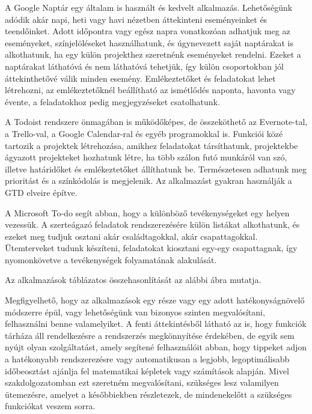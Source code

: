 


A Google Naptár egy általam is használt és kedvelt alkalmazás. Lehetőségünk adódik akár napi, heti vagy havi nézetben áttekinteni eseményeinket és teendőinket. Adott időpontra vagy egész napra vonatkozóan adhatjuk meg az eseményeket, színjelöléseket használhatunk, és úgynevezett saját naptárakat is alkothatunk, ha egy külön projekthez szeretnénk eseményeket rendelni. Ezeket a naptárakat láthatóvá és nem láthatóvá tehetjük, így külön csoportokban jól áttekinthetővé válik minden esemény. Emlékeztetőket és feladatokat lehet létrehozni, az emlékeztetőknél beállítható az ismétlődés naponta, havonta vagy évente, a feladatokhoz pedig megjegyzéseket csatolhatunk.


A Todoist rendszere önmagában is működőképes, de összeköthető az Evernote-tal, a Trello-val, a Google Calendar-ral és egyéb programokkal is. Funkciói közé tartozik a projektek létrehozása, amikhez feladatokat társíthatunk, projektekbe ágyazott projekteket hozhatunk létre, ha több szálon futó munkáról van szó, illetve határidőket és emlékeztetőket állíthatunk be. Természetesen adhatunk meg prioritást és a színkódolás is megjelenik. Az alkalmazást gyakran használják a GTD elveire építve.


A Microsoft To-do segít abban, hogy a különböző tevékenységeket egy helyen vezessük. A szerteágazó feladatok rendszerezésére külön listákat alkothatunk, és ezeket meg tudjuk osztani akár családtagokkal, akár csapattagokkal. Ütemterveket tudunk készíteni, feladatokat kiosztani egy-egy csapattagnak, így nyomonkövetve a tevékenységek folyamatának alakulását.


Az alkalmazások táblázatos összehasonlítását az alábbi ábra mutatja.


Megfigyelhető, hogy az alkalmazások egy része vagy egy adott hatékonyságnövelő módszerre épül, vagy lehetőségünk van bizonyos szinten megvalósítani, felhasználni benne valamelyiket. A fenti áttekintésből látható az is, hogy funkciók tárháza áll rendelkezésre a rendszerzés megkönnyítése érdekében, de egyik sem nyújt olyan szolgáltatást, amely segítené felhasználóit abban, hogy tippeket adjon a hatékonyabb rendszerezésre vagy automatikusan a legjobb, legoptimálisabb időbeosztást ajánlja fel matematikai képletek vagy számítások alapján. Mivel szakdolgozatomban ezt szeretném megvalósítani, szükséges lesz valamilyen ütemezésre, amelyet a későbbiekben részletezek, de mindenekelőtt a szükséges funkciókat veszem sorra.
